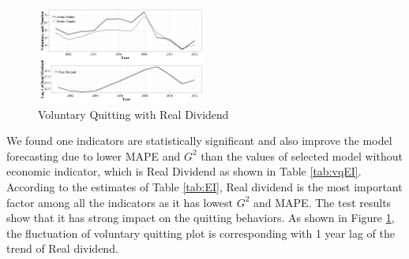 \documentclass[12pt,letterpaper]{article}
\begin{document}
\begin{figure}
	\centering
	\includegraphics[width=0.5\textwidth]{realdividend.png}
	\caption{Voluntary Quitting with Real Dividend}
	\label{fig:vqrealdividend}
\end{figure}
We found one indicators are statistically significant and also improve the model forecasting due to lower MAPE and $G^2$ than the values of selected model without economic indicator, which is Real Dividend as shown in Table \ref{tab:vqEI}. According to the estimates of Table \ref{tab:EI}, Real dividend is the most important factor among all the indicators as it has lowest $G^2$ and MAPE. The test results show that it has strong impact on the quitting behaviors. As shown in Figure \ref{fig:vqrealdividend}, the fluctuation of voluntary quitting plot is corresponding with 1 year lag of the trend of Real dividend.



\end{document}
